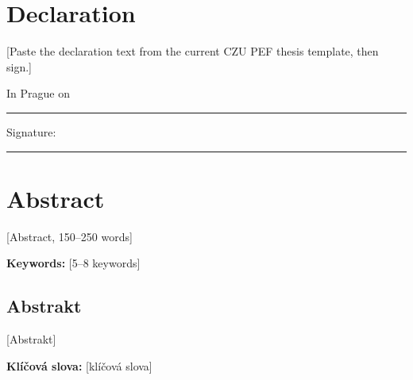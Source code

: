 
\chapter*{Declaration}
[Paste the declaration text from the current CZU PEF thesis template, then sign.]

\vspace{2cm}
\noindent In Prague on \rule{5cm}{0.4pt} \hfill Signature: \rule{5cm}{0.4pt}

\chapter*{Abstract}
[Abstract, 150--250 words]

\noindent\textbf{Keywords:} [5--8 keywords]

\begin{otherlanguage}{czech}
\chapter*{Abstrakt}
[Abstrakt]

\noindent\textbf{Klíčová slova:} [klíčová slova]
\end{otherlanguage}
